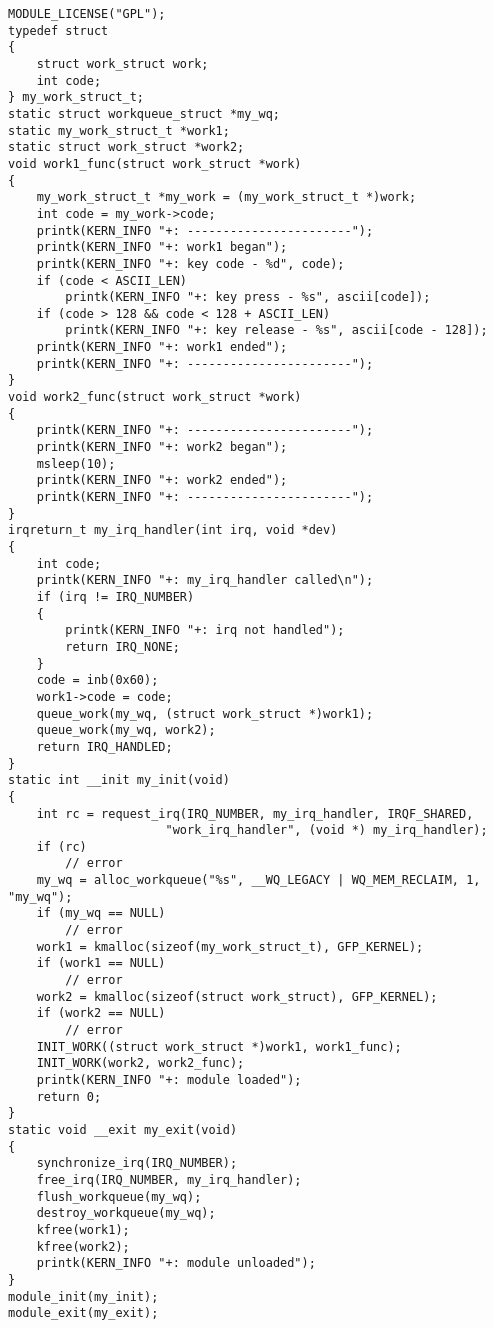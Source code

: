 \begin{lstlisting}
MODULE_LICENSE("GPL");
typedef struct
{
    struct work_struct work;
    int code;
} my_work_struct_t;
static struct workqueue_struct *my_wq;
static my_work_struct_t *work1;
static struct work_struct *work2;
void work1_func(struct work_struct *work)
{
    my_work_struct_t *my_work = (my_work_struct_t *)work;
    int code = my_work->code;
    printk(KERN_INFO "+: -----------------------");
    printk(KERN_INFO "+: work1 began");
    printk(KERN_INFO "+: key code - %d", code);
    if (code < ASCII_LEN)
        printk(KERN_INFO "+: key press - %s", ascii[code]);
    if (code > 128 && code < 128 + ASCII_LEN)
        printk(KERN_INFO "+: key release - %s", ascii[code - 128]);
    printk(KERN_INFO "+: work1 ended");
    printk(KERN_INFO "+: -----------------------");
}
void work2_func(struct work_struct *work)
{
    printk(KERN_INFO "+: -----------------------");
    printk(KERN_INFO "+: work2 began");
    msleep(10);
    printk(KERN_INFO "+: work2 ended");
    printk(KERN_INFO "+: -----------------------");
}
irqreturn_t my_irq_handler(int irq, void *dev)
{
    int code;
    printk(KERN_INFO "+: my_irq_handler called\n");
    if (irq != IRQ_NUMBER)
    {
        printk(KERN_INFO "+: irq not handled");
        return IRQ_NONE;
    }
    code = inb(0x60);
    work1->code = code;
    queue_work(my_wq, (struct work_struct *)work1);
    queue_work(my_wq, work2);
    return IRQ_HANDLED;
}
static int __init my_init(void)
{
    int rc = request_irq(IRQ_NUMBER, my_irq_handler, IRQF_SHARED,
                      "work_irq_handler", (void *) my_irq_handler);
    if (rc) 
        // error
    my_wq = alloc_workqueue("%s", __WQ_LEGACY | WQ_MEM_RECLAIM, 1, "my_wq");
    if (my_wq == NULL)
        // error
    work1 = kmalloc(sizeof(my_work_struct_t), GFP_KERNEL);
    if (work1 == NULL)
        // error
    work2 = kmalloc(sizeof(struct work_struct), GFP_KERNEL);
    if (work2 == NULL)
        // error
    INIT_WORK((struct work_struct *)work1, work1_func);
    INIT_WORK(work2, work2_func);
    printk(KERN_INFO "+: module loaded");
    return 0;
}
static void __exit my_exit(void)
{
    synchronize_irq(IRQ_NUMBER);
    free_irq(IRQ_NUMBER, my_irq_handler);
    flush_workqueue(my_wq);
    destroy_workqueue(my_wq);
    kfree(work1);
    kfree(work2);
    printk(KERN_INFO "+: module unloaded");
}
module_init(my_init);
module_exit(my_exit);
\end{lstlisting}

